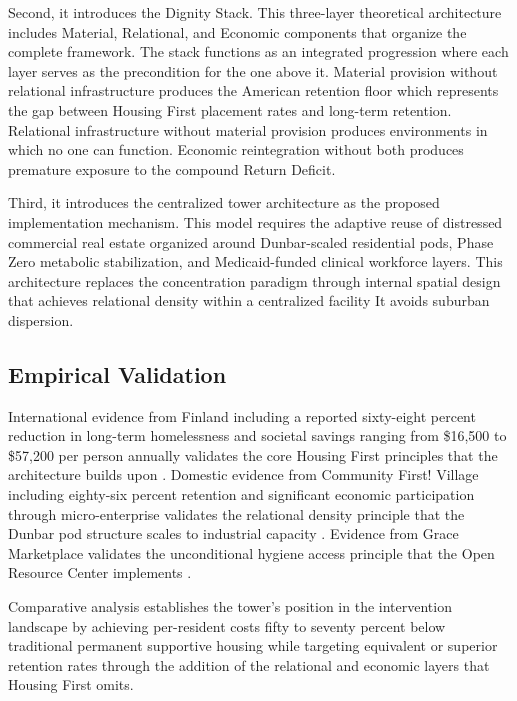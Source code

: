 \documentclass[12pt, letterpaper]{article}
\begin{document}
Second, it introduces the Dignity Stack. This three-layer theoretical architecture includes Material, Relational, and Economic components that organize the complete framework. The stack functions as an integrated progression where each layer serves as the precondition for the one above it. Material provision without relational infrastructure produces the American retention floor which represents the gap between Housing First placement rates and long-term retention. Relational infrastructure without material provision produces environments in which no one can function. Economic reintegration without both produces premature exposure to the compound Return Deficit.

Third, it introduces the centralized tower architecture as the proposed implementation mechanism. This model requires the adaptive reuse of distressed commercial real estate organized around Dunbar-scaled residential pods, Phase Zero metabolic stabilization, and Medicaid-funded clinical workforce layers. This architecture replaces the concentration paradigm through internal spatial design that achieves relational density within a centralized facility It avoids suburban dispersion.

\subsection{Empirical Validation}

International evidence from Finland including a reported sixty-eight percent reduction in long-term homelessness and societal savings ranging from \$16,500 to \$57,200 per person annually validates the core Housing First principles that the architecture builds upon \citep{sdg16plus_2023, yfoundation_2024}. Domestic evidence from Community First! Village including eighty-six percent retention and significant economic participation through micro-enterprise validates the relational density principle that the Dunbar pod structure scales to industrial capacity \citep{mlf_2024}. Evidence from Grace Marketplace validates the unconditional hygiene access principle that the Open Resource Center implements \citep{grace_marketplace_2024}.

Comparative analysis establishes the tower's position in the intervention landscape by achieving per-resident costs fifty to seventy percent below traditional permanent supportive housing while targeting equivalent or superior retention rates through the addition of the relational and economic layers that Housing First omits.
\end{document}
